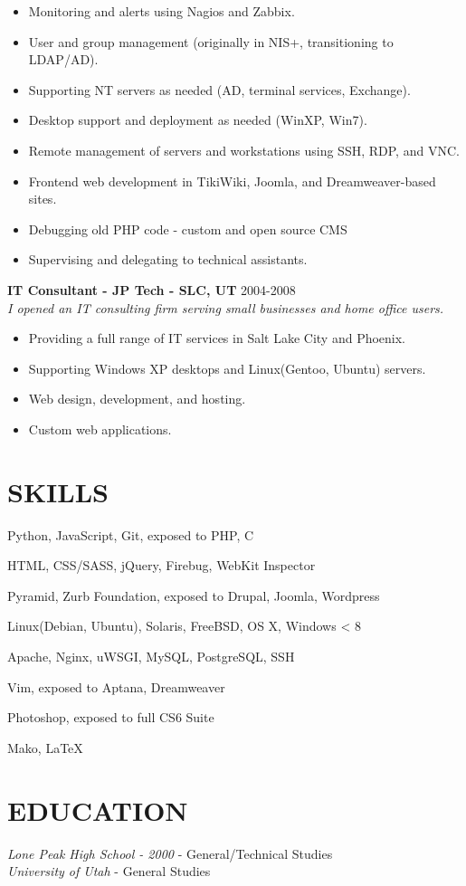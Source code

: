 \documentclass[line,margin]{res}
\begin{document}
\begin{resume}
\begin{itemize}
   \item Monitoring and alerts using Nagios and Zabbix.
   \item User and group management (originally in NIS+, transitioning to LDAP/AD).
   \item Supporting NT servers as needed (AD, terminal services, Exchange).
   \item Desktop support and deployment as needed (WinXP, Win7).
   \item Remote management of servers and workstations using SSH, RDP, and VNC.
   \item Frontend web development in TikiWiki, Joomla, and Dreamweaver-based sites.
   \item Debugging old PHP code - custom and open source CMS
   \item Supervising and delegating to technical assistants.
   \end{itemize}
 {\bf IT Consultant - JP Tech - SLC, UT} \hfill 2004-2008\\
 {\sl I opened an IT consulting firm serving small businesses and home office users.}
  \begin{itemize} \itemsep -2pt
  \item Providing a full range of IT services in Salt Lake City and Phoenix.    
  \item Supporting Windows XP desktops and Linux(Gentoo, Ubuntu) servers.
  \item Web design, development, and hosting.
  \item Custom web applications.
  \end{itemize}

\section{SKILLS}
 \begin{description} \itemsep -2pt
 \item[Development:] Python, JavaScript, Git, exposed to PHP, C
 \item[Web:] HTML, CSS/SASS, jQuery, Firebug, WebKit Inspector
 \item[Frameworks:] Pyramid, Zurb Foundation, exposed to Drupal, Joomla, Wordpress
 \item[Operating Systems:] Linux(Debian, Ubuntu), Solaris, FreeBSD, OS X, Windows < 8
 \item[Services:] Apache, Nginx, uWSGI, MySQL, PostgreSQL, SSH
 \item[Environments:] Vim, exposed to Aptana, Dreamweaver 
 \item[Design:] Photoshop, exposed to full CS6 Suite
 \item[Markup:] Mako, \LaTeX
 \end{description}
					
\section{EDUCATION}
 {\sl Lone Peak High School - 2000} - General/Technical Studies\\
 {\sl University of Utah} - General Studies

\end{resume}
\end{document}
